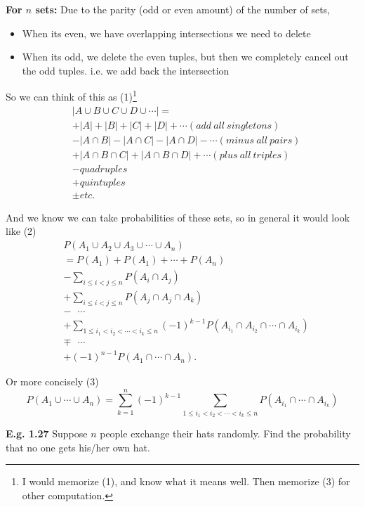 \documentclass[12pt]{book}
\begin{document}
\noindent \textbf{For $n$ sets:}
Due to the parity (odd or even amount) of the number of sets, 
\begin{itemize}
\item When its even, we have overlapping intersections we need to delete
\item When its odd, we delete the even tuples, but then we completely cancel out the odd tuples. i.e. we add back the intersection
\end{itemize}
So we can think of this as (1)\footnote{I would memorize (1), and know what it means well. Then memorize (3) for other computation.}
\begin{align*}
&|A \cup B \cup C \cup D\cup \cdots| = \\
& +|A|+|B|+|C|+|D|+\cdots (add~all~singletons)\\
& -|A\cap B|-|A\cap C|-|A\cap D|-\cdots (minus~all~pairs)\\
& +|A\cap B \cap C |+|A\cap B \cap D|+\cdots (plus~all~triples)\\
& -quadruples\\
& +quintuples\\
& \pm etc.
\end{align*}

And we know we can take probabilities of these sets, so in general it would look like (2)
\begin{align*}
&P(A_{1}\cup A_{2} \cup A_{3} \cup \cdots \cup A_n)\\
&= P(A_{1}) + P(A_{1}) + \cdots +P(A_{n}) \\
& -\sum\limits_{i\leq i<j\leq n} P(A_{i}\cap A_j)\\
& + \sum\limits_{i\leq i<j\leq n} P(A_{j}\cap A_{j} \cap A_{k}) \\
&-~~~\cdots\\
&+ \sum\limits_{1\leq i_{1}<i_{2}<\cdots<i_{k}\leq n} (-1)^{k-1} P(A_{i_{1}}\cap A_{i_{2}} \cap \cdots \cap A_{i_{k}}) \\
& \mp~~~\cdots\\
& +(-1)^{n-1} P(A_{1} \cap \cdots \cap A_{n}).
\end{align*}


Or more concisely (3)
$$\boxed {P(A_{1} \cup \cdots \cup A_{n})=\sum\limits_{k=1}^{n} (-1)^{k-1} \sum\limits_{1\leq i_{1} <i_{2} < \cdots < i_{k} \leq n} P(A_{i_{1}} \cap \cdots \cap A_{i_{k}}) }$$

\noindent \textbf{E.g. 1.27} Suppose $n$ people exchange their hats randomly. Find the probability that no one gets his/her own hat.\\
\end{document}
